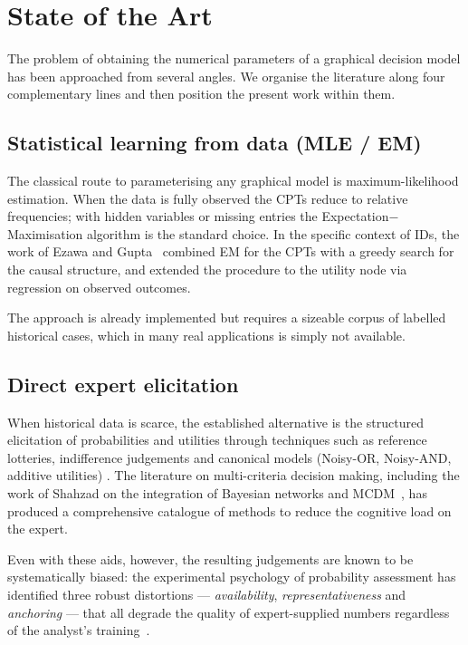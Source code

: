
\chapter{State of the Art}
\label{ch:state-of-the-art}

The problem of obtaining the numerical parameters of a graphical
decision model has been approached from several angles. We organise
the literature along four complementary lines and then position the
present work within them.

\section{Statistical learning from data (MLE / EM)}

The classical route to parameterising any graphical model is
maximum-likelihood estimation. When the data is fully observed the CPTs reduce to relative frequencies; with hidden variables or missing
entries the Expectation$-$Maximisation algorithm is the standard
choice. In the specific context of IDs, the work of Ezawa and Gupta~\cite{ezawa1997learning} combined EM for the CPTs with a
greedy search for the causal structure, and extended the procedure to
the utility node via regression on observed outcomes.

The approach is already implemented but requires a sizeable corpus of labelled
historical cases, which in many real applications is simply not available.

\section{Direct expert elicitation}

When historical data is scarce, the established alternative is the
structured elicitation of probabilities and utilities through
techniques such as reference lotteries, indifference judgements and
canonical models (Noisy-OR, Noisy-AND, additive utilities)
\cite{bielza2010modeling}. The literature on multi-criteria decision
making, including the work of Shahzad on the integration of
Bayesian networks and MCDM~\cite{shahzad2022mcdm}, has produced a comprehensive catalogue of methods to reduce the cognitive load on the
expert. 

Even with these aids, however, the resulting judgements are known to be systematically biased: the experimental psychology of
probability assessment has identified three robust distortions —
\emph{availability}, \emph{representativeness} and
\emph{anchoring} — that all degrade the quality of expert-supplied
numbers regardless of the analyst's
training~\cite{bielza2010modeling}. 

